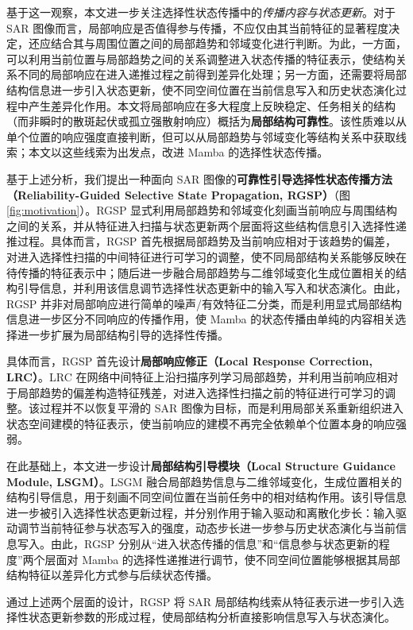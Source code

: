 \documentclass[UTF8,12pt,a4paper]{ctexart}
\begin{document}
基于这一观察，本文进一步关注选择性状态传播中的\emph{传播内容与状态更新}。对于 SAR 图像而言，局部响应是否值得参与传播，不应仅由其当前特征的显著程度决定，还应结合其与周围位置之间的局部趋势和邻域变化进行判断。为此，一方面，可以利用当前位置与局部趋势之间的关系调整进入状态传播的特征表示，使结构关系不同的局部响应在进入递推过程之前得到差异化处理；另一方面，还需要将局部结构信息进一步引入状态更新，使不同空间位置在当前信息写入和历史状态演化过程中产生差异化作用。本文将局部响应在多大程度上反映稳定、任务相关的结构（而非瞬时的散斑起伏或孤立强散射响应）概括为\textbf{局部结构可靠性}。该性质难以从单个位置的响应强度直接判断，但可以从局部趋势与邻域变化等结构关系中获取线索；本文以这些线索为出发点，改进 Mamba 的选择性状态传播。

基于上述分析，我们提出一种面向 SAR 图像的\textbf{可靠性引导选择性状态传播方法（Reliability-Guided Selective State Propagation, RGSP）}（图\ref{fig:motivation}）。RGSP 显式利用局部趋势和邻域变化刻画当前响应与周围结构之间的关系，并从特征进入扫描与状态更新两个层面将这些结构信息引入选择性递推过程。具体而言，RGSP 首先根据局部趋势及当前响应相对于该趋势的偏差，对进入选择性扫描的中间特征进行可学习的调整，使不同局部结构关系能够反映在待传播的特征表示中；随后进一步融合局部趋势与二维邻域变化生成位置相关的结构引导信息，并利用该信息调节选择性状态更新中的输入写入和状态演化。由此，RGSP 并非对局部响应进行简单的噪声/有效特征二分类，而是利用显式局部结构信息进一步区分不同响应的传播作用，使 Mamba 的状态传播由单纯的内容相关选择进一步扩展为局部结构引导的选择性传播。

具体而言，RGSP 首先设计\textbf{局部响应修正（Local Response Correction, LRC）}。LRC 在网络中间特征上沿扫描序列学习局部趋势，并利用当前响应相对于局部趋势的偏差构造特征残差，对进入选择性扫描之前的特征进行可学习的调整。该过程并不以恢复平滑的 SAR 图像为目标，而是利用局部关系重新组织进入状态空间建模的特征表示，使当前响应的建模不再完全依赖单个位置本身的响应强弱。

在此基础上，本文进一步设计\textbf{局部结构引导模块（Local Structure Guidance Module, LSGM）}。LSGM 融合局部趋势信息与二维邻域变化，生成位置相关的结构引导信息，用于刻画不同空间位置在当前任务中的相对结构作用。该引导信息进一步被引入选择性状态更新过程，并分别作用于输入驱动和离散化步长：输入驱动调节当前特征参与状态写入的强度，动态步长进一步参与历史状态演化与当前信息写入。由此，RGSP 分别从“进入状态传播的信息”和“信息参与状态更新的程度”两个层面对 Mamba 的选择性递推进行调节，使不同空间位置能够根据其局部结构特征以差异化方式参与后续状态传播。

通过上述两个层面的设计，RGSP 将 SAR 局部结构线索从特征表示进一步引入选择性状态更新参数的形成过程，使局部结构分析直接影响信息写入与状态演化。
\end{document}
